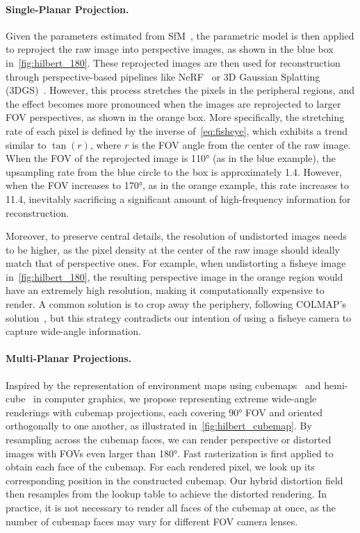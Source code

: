 \paragraph{Single-Planar Projection.} Given the parameters estimated from SfM~\cite{schoenberger2016sfm}, the parametric model is then applied to reproject the raw image into perspective images, as shown in the blue box in~\cref{fig:hilbert_180}. These reprojected images are then used for reconstruction through perspective-based pipelines like NeRF~\cite{mildenhall2021nerf} or 3D Gaussian Splatting (3DGS)~\cite{kerbl20233d}. However, this process stretches the pixels in the peripheral regions, and the effect becomes more pronounced when the images are reprojected to larger FOV perspectives, as shown in the orange box.
More specifically, the stretching rate of each pixel is defined by the inverse of~\cref{eq:fisheye}, which exhibits a trend similar to $\tan(r)$, where $r$ is the FOV angle from the center of the raw image. When the FOV of the reprojected image is 110\si{\degree} (as in the blue example), the upsampling rate from the blue circle to the box is approximately 1.4. However, when the FOV increases to 170\si{\degree}, as in the orange example, this rate increases to 11.4, inevitably sacrificing a significant amount of high-frequency information for reconstruction.

Moreover, to preserve central details, the resolution of undistorted images needs to be higher, as the pixel density at the center of the raw image should ideally match that of perspective ones. For example, when undistorting a fisheye image in~\cref{fig:hilbert_180}, the resulting perspective image in the orange region would have an extremely high resolution, making it computationally expensive to render. A common solution is to crop away the periphery, following COLMAP's solution~\cite{schoenberger2016sfm}, but this strategy contradicts our intention of using a fisheye camera to capture wide-angle information.

\paragraph{Multi-Planar Projections.} Inspired by the representation of environment maps using cubemaps~\cite{greene1986environment} and hemi-cube~\cite{Cohen:1985:hemicube} in computer graphics, we propose representing extreme wide-angle renderings with cubemap projections, each covering 90\si{\degree} FOV and oriented orthogonally to one another, as illustrated in~\cref{fig:hilbert_cubemap}. By resampling across the cubemap faces, we can render perspective or distorted images with FOVs even larger than 180\si{\degree}. Fast rasterization is first applied to obtain each face of the cubemap. For each rendered pixel, we look up its corresponding position in the constructed cubemap. Our hybrid distortion field then resamples from the lookup table to achieve the distorted rendering. In practice, it is not necessary to render all faces of the cubemap at once, as the number of cubemap faces may vary for different FOV camera lenses.

